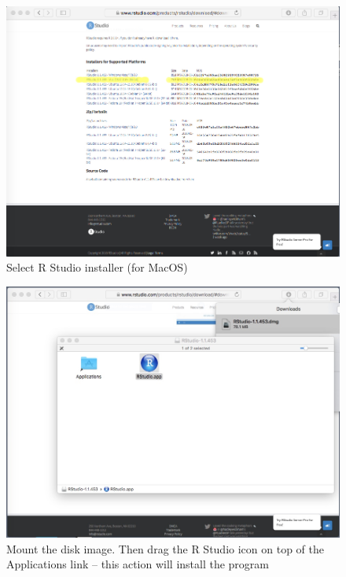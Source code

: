 \begin{figure}[h!] %
   \centering
   \includegraphics[width=5in]{./1-Introduction/SelectRStudioInstaller.jpg} 
   \caption{Select R Studio installer (for MacOS)}
\end{figure}

\begin{figure}[h!] %
   \centering
   \includegraphics[width=5in]{./1-Introduction/MountDiskImage.jpeg} 
   \caption{Mount the disk image.  Then drag the R Studio icon on top of the Applications link -- this action will install the program}
\end{figure}


